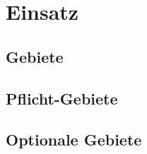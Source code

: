 %
%


\chapter{Einsatz}
\label{Einsatz}


\section{Gebiete}

\section{Pflicht-Gebiete}

\section{Optionale Gebiete}


